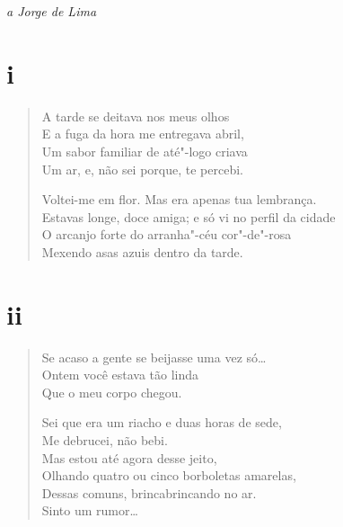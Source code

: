 {\begin{flushright}
\emph{a Jorge de Lima}
\end{flushright}

\section*{i}


\begin{verse}
A tarde se deitava nos meus olhos\\
E a fuga da hora me entregava abril,\\
Um sabor familiar de até"-logo criava\\
Um ar, e, não sei porque, te percebi.

Voltei-me em flor. Mas era apenas tua lembrança.\\
Estavas longe, doce amiga; e só vi no perfil da cidade\\
O arcanjo forte do arranha"-céu cor"-de"-rosa\\
Mexendo asas azuis dentro da tarde.
\end{verse}


\pagebreak
\section*{ii}

\begin{verse}
Se acaso a gente se beijasse uma vez só\ldots{}\\
Ontem você estava tão linda\\
Que o meu corpo chegou.

Sei que era um riacho e duas horas de sede,\\
Me debrucei, não bebi.\\
Mas estou até agora desse jeito,\\
Olhando quatro ou cinco borboletas amarelas,\\
Dessas comuns, brincabrincando no ar.\\
Sinto um rumor\ldots{}
\end{verse}

}
